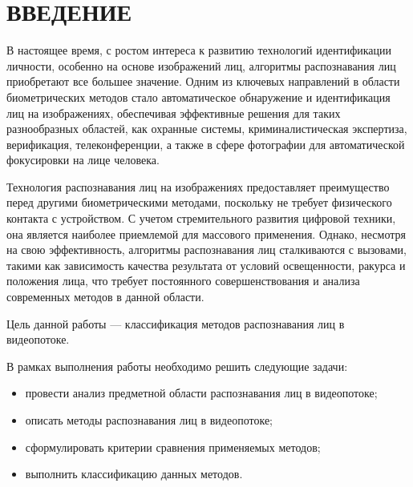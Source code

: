 \chapter*{ВВЕДЕНИЕ}

В настоящее время, с ростом интереса к развитию технологий идентификации 
личности, особенно на основе изображений лиц, алгоритмы распознавания лиц 
приобретают все большее значение. Одним из ключевых направлений в области 
биометрических методов стало автоматическое обнаружение и идентификация 
лиц на изображениях, обеспечивая эффективные решения для таких 
разнообразных областей, как охранные системы, криминалистическая 
экспертиза, верификация, телеконференции, а также в сфере фотографии для 
автоматической фокусировки на лице человека.

Технология распознавания лиц на изображениях предоставляет преимущество 
перед другими биометрическими методами, поскольку не требует физического 
контакта с устройством. С учетом стремительного развития цифровой техники, 
она является наиболее приемлемой для массового применения. Однако, 
несмотря на свою эффективность, алгоритмы распознавания лиц сталкиваются 
с вызовами, такими как зависимость качества результата от условий 
освещенности, ракурса и положения лица, что требует постоянного 
совершенствования и анализа современных методов в данной области.

Цель данной работы --- классификация методов распознавания лиц в 
видеопотоке.

В рамках выполнения работы необходимо решить следующие задачи:

\begin{itemize}[label=---]
  \item провести анализ предметной области распознавания лиц в видеопотоке;
  \item описать методы распознавания лиц в видеопотоке;
  \item сформулировать критерии сравнения применяемых методов;
  \item выполнить классификацию данных методов.
\end{itemize}

